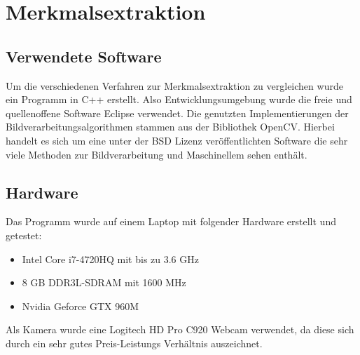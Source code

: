 \chapter{Merkmalsextraktion}

\section{Verwendete Software}

Um die verschiedenen Verfahren zur Merkmalsextraktion zu vergleichen wurde ein Programm in C++ erstellt.
Also Entwicklungsumgebung wurde die freie und quellenoffene Software Eclipse verwendet.
Die genutzten Implementierungen der Bildverarbeitungsalgorithmen stammen aus der Bibliothek OpenCV. Hierbei handelt es sich um eine unter der BSD Lizenz veröffentlichten Software die sehr viele Methoden zur Bildverarbeitung und Maschinellem sehen enthält. \cite{cvlib}

\section{Hardware}

Das Programm wurde auf einem Laptop mit folgender Hardware erstellt und getestet:
\begin{itemize}
\item Intel Core i7-4720HQ mit bis zu 3.6 GHz
\item 8 GB DDR3L-SDRAM mit 1600 MHz
\item Nvidia Geforce GTX 960M
\end{itemize}

Als Kamera wurde eine Logitech HD Pro C920 Webcam verwendet, da diese sich durch ein sehr gutes Preis-Leistungs Verhältnis auszeichnet.

